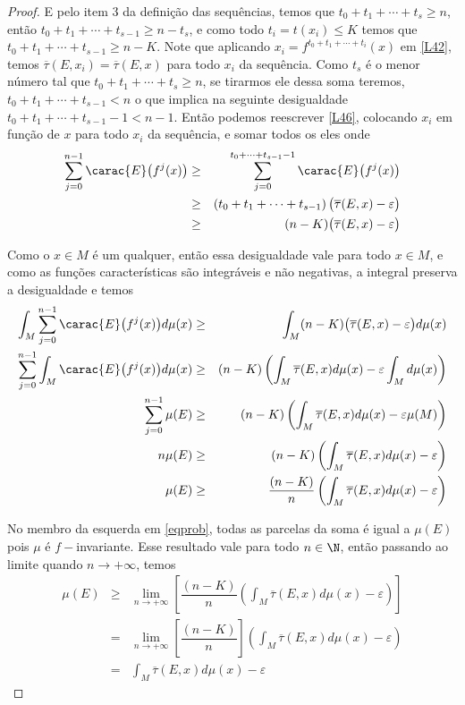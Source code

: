 \begin{proof}
E pelo item 3 da definição das sequências, temos que $t_0+t_1+\cdots+t_{s}\geq n$, então $t_0+t_1+\cdots+t_{s-1}\geq n-t_s$, e como todo $t_i=t(x_i)\leq K$ temos que $t_0+t_1+\cdots+t_{s-1}\geq n-K$. Note que aplicando $x_i=f^{t_0+t_1+\cdots+t_{i}}(x)$ em \eqref{L42}, temos $\overline{\tau}(E,x_i)=\overline{\tau}(E,x)$ para todo $x_i$ da sequência. Como $t_s$ é o menor número tal que $t_0+t_1+\cdots+t_{s}\geq n$, se tirarmos ele dessa soma teremos, $t_0+t_1+\cdots+t_{s-1}<n$ o que implica na seguinte desigualdade $t_0+t_1+\cdots+t_{s-1}-1< n-1$. Então podemos reescrever \eqref{L46}, colocando $x_i$ em função de $x$ para todo $x_i$ da sequência, e somar todos os eles onde 
\begin{eqnarray}
\sum_{j=0}^{n-1}\carac{E}\big(f^j(x)\big) & \geq & \sum_{j=0}^{t_0+\cdots+t_{s-1}-1}\carac{E}\big(f^j(x)\big)\nonumber\\
& \geq & \left(t_0+t_1+\cdots+t_{s-1}\right)\big(\overline{\tau}(E,x)-\varepsilon\big)\nonumber\\
& \geq & (n-K)\big(\overline{\tau}(E,x)-\varepsilon\big)\label{L477}
\end{eqnarray}

Como o $x\in M$ é um qualquer, então essa desigualdade vale para todo $x\in M$, e como as funções características são integráveis e não negativas, a integral preserva a desigualdade e temos
\begin{eqnarray}
\int_{M}\sum_{j=0}^{n-1}\carac{E}\big(f^j(x)\big)d\mu(x) & \geq & \int_{M}(n-K)\big(\overline{\tau}(E,x)-\varepsilon\big)d\mu(x)\nonumber\\
\sum_{j=0}^{n-1}\int_{M}\carac{E}\big(f^j(x)\big)d\mu(x) & \geq & (n-K)\left(\int_{M}\overline{\tau}(E,x)d\mu(x)-\varepsilon\int_{M} d\mu(x)\right)\label{eqprob}\\
\sum_{j=0}^{n-1}\mu(E) & \geq & (n-K)\left(\int_{M}\overline{\tau}(E,x)d\mu(x)-\varepsilon\mu(M)\right)\nonumber\\
n\mu(E) & \geq & (n-K)\left(\int_{M}\overline{\tau}(E,x)d\mu(x)-\varepsilon\right)\nonumber\\
\mu(E) & \geq & \dfrac{(n-K)}{n}\left(\int_{M}\overline{\tau}(E,x)d\mu(x)-\varepsilon\right)\nonumber
\end{eqnarray}

No membro da esquerda em \eqref{eqprob}, todas as parcelas da soma é igual a $\mu(E)$ pois $\mu$ é $f-$invariante. Esse resultado vale para todo $n\in\N$, então passando ao limite quando $n\to+\infty$, temos
\begin{eqnarray*}
\mu(E) & \geq & \lim_{n\to+\infty}\left[\dfrac{(n-K)}{n}\left(\int_{M}\overline{\tau}(E,x)d\mu(x)-\varepsilon\right)\right]\\
& = & \lim_{n\to+\infty}\left[\dfrac{(n-K)}{n}\right]\left(\int_{M}\overline{\tau}(E,x)d\mu(x)-\varepsilon\right)\\
& = & \int_{M}\overline{\tau}(E,x)d\mu(x)-\varepsilon
\end{eqnarray*}


\end{proof}
